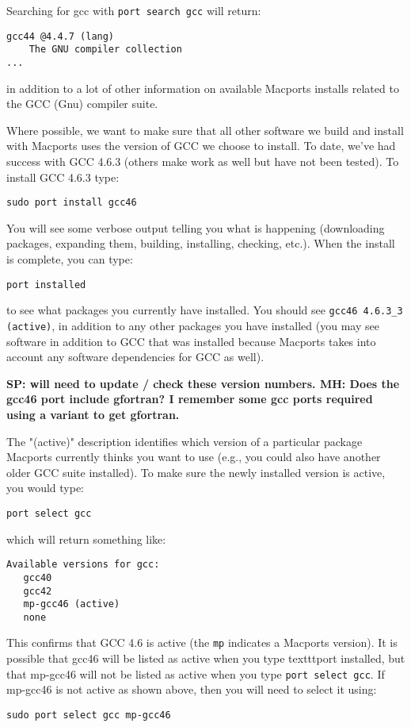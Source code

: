 \begin{mdframed}[style=mac] %
Searching for gcc with \texttt{port search gcc} will return:

\begin{verbatim}
gcc44 @4.4.7 (lang) 
    The GNU compiler collection 
...
\end{verbatim}

in addition to a lot of other information on available Macports installs related to the GCC (Gnu) compiler suite. 

Where possible, we want to make sure that all other software we build and install 
with Macports uses the version of GCC we choose to install. To date, we've had success 
with GCC 4.6.3 (others make work as well but have not been tested). 
To install GCC 4.6.3 type:

\texttt{sudo port install gcc46}

You will see some verbose output telling you what is happening (downloading packages, 
expanding them, building, installing, checking, etc.). When the install is complete, you can type: 

\texttt{port installed} 

to see what packages you currently have installed. You should see \texttt{gcc46 \@4.6.3\_3 (active)}, 
in addition to any other packages you have installed (you may see software in addition to GCC 
that was installed because Macports takes into account any software dependencies for GCC as well). 

\textbf{SP: will need to update / check these version numbers.  MH: Does the gcc46 port include gfortran?  I remember some gcc ports required using a variant to get gfortran. }

The "(active)" description identifies which version of a particular package Macports 
currently thinks you want to use (e.g., you could also have another older GCC suite installed). 
To make sure the newly installed version is active, you would type:

\texttt{port select gcc}

which will return something like:

\begin{verbatim}
Available versions for gcc:
   gcc40
   gcc42
   mp-gcc46 (active)
   none
\end{verbatim}

This confirms that GCC 4.6 is active (the \texttt{mp} indicates a Macports version). 
It is possible that gcc46 will be listed as active when you type texttt{port installed}, 
but that mp-gcc46 will not be listed as active when you type \texttt{port select gcc}. 
If mp-gcc46 is not active as shown above, then you will need to select it using:

\texttt{sudo port select gcc mp-gcc46}
\end{mdframed}              %


